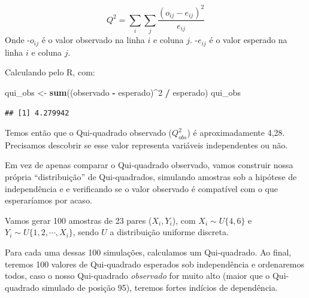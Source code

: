 \documentclass[
]{book}
\newenvironment{Shaded}{\begin{snugshade}}{\end{snugshade}}
\newcommand{\DecValTok}[1]{\textcolor[rgb]{0.00,0.00,0.81}{#1}}
\newcommand{\FunctionTok}[1]{\textcolor[rgb]{0.13,0.29,0.53}{\textbf{#1}}}
\newcommand{\NormalTok}[1]{#1}
\newcommand{\OtherTok}[1]{\textcolor[rgb]{0.56,0.35,0.01}{#1}}
\newcommand{\SpecialCharTok}[1]{\textcolor[rgb]{0.81,0.36,0.00}{\textbf{#1}}}
\begin{document}
\[
Q^2 = \sum_i \sum_j \frac{(o_{ij}-e_{ij})^2}{e_{ij}}
\]
Onde
-\(o_{ij}\) é o valor observado na linha \(i\) e coluna \(j\).
-\(e_{ij}\) é o valor esperado na linha \(i\) e coluna \(j\).

Calculando pelo R, com:

\begin{Shaded}
\begin{Highlighting}[]
\NormalTok{qui\_obs }\OtherTok{\textless{}{-}} \FunctionTok{sum}\NormalTok{((observado }\SpecialCharTok{{-}}\NormalTok{ esperado)}\SpecialCharTok{\^{}}\DecValTok{2} \SpecialCharTok{/}\NormalTok{ esperado)}
\NormalTok{qui\_obs}
\end{Highlighting}
\end{Shaded}

\begin{verbatim}
## [1] 4.279942
\end{verbatim}

Temos então que o Qui-quadrado observado (\(Q_{obs}^2\)) é aproximadamente 4,28. Precisamos descobrir se esse valor representa variáveis independentes ou não.

Em vez de apenas comparar o Qui-quadrado observado, vamos construir nossa própria ``distribuição'' de Qui-quadrados, simulando amostras sob a hipótese de independência e e verificando se o valor observado é compatível com o que esperaríamos por acaso.

Vamos gerar 100 amostras de 23 pares (\(X_i, Y_i\)), com \(X_i \sim U\{4, 6\}\) e \(Y_i \sim U\{1, 2, \cdots, X_i\}\), sendo \(U\) a distribuição uniforme discreta.

Para cada uma dessas 100 simulações, calculamos um Qui-quadrado. Ao final, teremos 100 valores de Qui-quadrado esperados sob independência e ordenaremos todos, caso o nosso Qui-quadrado \emph{observado} for muito alto (maior que o Qui-quadrado simulado de posição 95), teremos fortes indícios de dependência.
\end{document}
